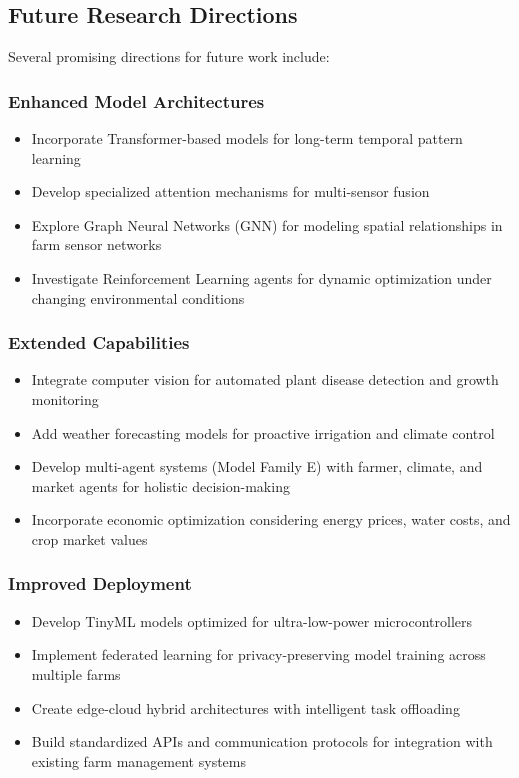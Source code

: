 \documentclass[conference]{IEEEtran}
\begin{document}
\subsection{Future Research Directions}

Several promising directions for future work include:

\subsubsection{Enhanced Model Architectures}
\begin{itemize}
\item Incorporate Transformer-based models for long-term temporal pattern learning
\item Develop specialized attention mechanisms for multi-sensor fusion
\item Explore Graph Neural Networks (GNN) for modeling spatial relationships in farm sensor networks
\item Investigate Reinforcement Learning agents for dynamic optimization under changing environmental conditions
\end{itemize}

\subsubsection{Extended Capabilities}
\begin{itemize}
\item Integrate computer vision for automated plant disease detection and growth monitoring
\item Add weather forecasting models for proactive irrigation and climate control
\item Develop multi-agent systems (Model Family E) with farmer, climate, and market agents for holistic decision-making
\item Incorporate economic optimization considering energy prices, water costs, and crop market values
\end{itemize}

\subsubsection{Improved Deployment}
\begin{itemize}
\item Develop TinyML models optimized for ultra-low-power microcontrollers
\item Implement federated learning for privacy-preserving model training across multiple farms
\item Create edge-cloud hybrid architectures with intelligent task offloading
\item Build standardized APIs and communication protocols for integration with existing farm management systems
\end{itemize}
\end{document}
